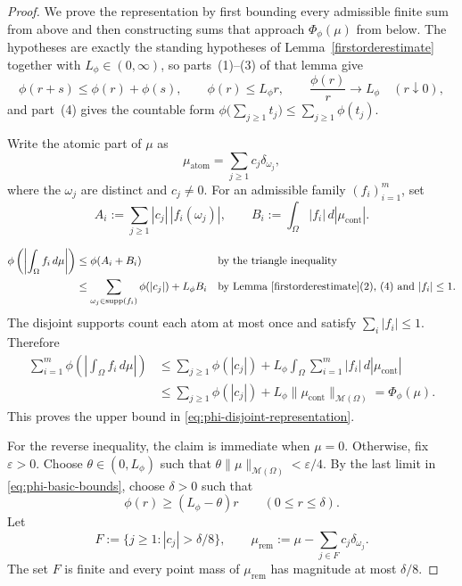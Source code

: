 \documentclass[11pt]{amsart}
\theoremstyle{definition}
\theoremstyle{remark}
\DeclareMathOperator{\atom}{atom}
\DeclareMathOperator{\cont}{cont}
\DeclareMathOperator{\supp}{supp}
\begin{document}
\begin{proof}
We prove the representation by first bounding every admissible finite sum
from above and then constructing sums that approach
$\Phi_\phi(\mu)$ from below. The hypotheses are exactly the standing
hypotheses of Lemma~\ref{firstorderestimate} together with
$L_\phi\in(0,\infty)$, so parts~(1)--(3) of that lemma give
\begin{equation}
\label{eq:phi-basic-bounds}
	\phi(r+s)\le\phi(r)+\phi(s),
	\qquad
	\phi(r)\le L_\phi r,
	\qquad
	\frac{\phi(r)}{r}\longrightarrow L_\phi
	\quad(r\downarrow0),
\end{equation}
and part~(4) gives the countable form
$\phi\bigl(\sum_{j\ge1}t_j\bigr)\le\sum_{j\ge1}\phi(t_j)$.

Write the atomic part of $\mu$ as
\begin{equation*}
	\mu_{\atom}=\sum_{j\ge1}c_j\delta_{\omega_j},
\end{equation*}
where the $\omega_j$ are distinct and $c_j\ne0$. For an admissible family
$(f_i)_{i=1}^m$, set
\begin{equation*}
	A_i:=\sum_{j\ge1}|c_j|\,|f_i(\omega_j)|,
	\qquad
	B_i:=\int_\Omega|f_i|\,d|\mu_{\cont}|.
\end{equation*}

\begin{align*}
	\phi\left(\left|\int_\Omega f_i\,d\mu\right|\right)
	&\le \phi(A_i+B_i)
	&&\text{by the triangle inequality}\\
	&\le \sum_{\omega_j\in\supp(f_i)}\phi(|c_j|)+L_\phi B_i
	&&\text{by Lemma~\ref{firstorderestimate}(2),~(4) and }|f_i|\le1.
\end{align*}
The disjoint supports count each atom at most once and satisfy
$\sum_i|f_i|\le1$. Therefore
\begin{align*}
	\sum_{i=1}^m
	\phi\left(\left|\int_\Omega f_i\,d\mu\right|\right)
	&\le \sum_{j\ge1}\phi(|c_j|)
	+L_\phi\int_\Omega\sum_{i=1}^m|f_i|\,d|\mu_{\cont}|\\
	&\le \sum_{j\ge1}\phi(|c_j|)
	+L_\phi\|\mu_{\cont}\|_{\mathcal M(\Omega)}
	=\Phi_\phi(\mu).
\end{align*}
This proves the upper bound in \eqref{eq:phi-disjoint-representation}.

For the reverse inequality, the claim is immediate when $\mu=0$. Otherwise,
fix $\varepsilon>0$. Choose
$\theta\in(0,L_\phi)$ such that
$\theta\|\mu\|_{\mathcal M(\Omega)}<\varepsilon/4$. By the last limit in
\eqref{eq:phi-basic-bounds}, choose $\delta>0$ such that
\begin{equation}
\label{eq:phi-linear-near-zero}
	\phi(r)\ge(L_\phi-\theta)r
	\qquad(0\le r\le\delta).
\end{equation}
Let
\begin{equation*}
	F:=\{j\ge1:|c_j|>\delta/8\},
	\qquad
	\mu_{\mathrm{rem}}
	:=\mu-\sum_{j\in F}c_j\delta_{\omega_j}.
\end{equation*}
The set $F$ is finite and every point mass of $\mu_{\mathrm{rem}}$ has
magnitude at most $\delta/8$.


\end{proof}
\end{document}

